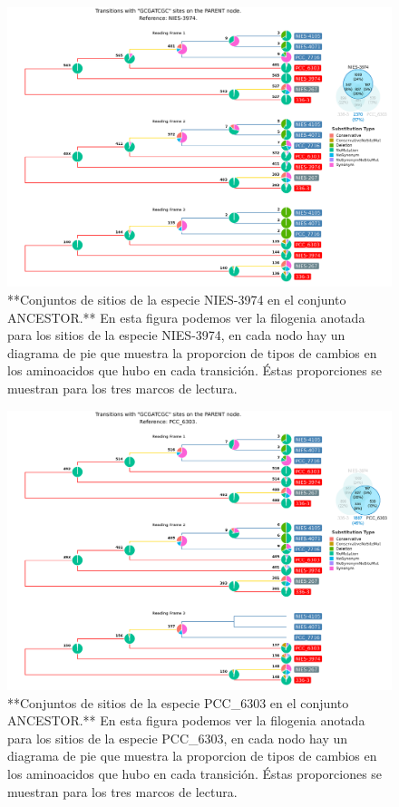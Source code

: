 \documentclass[
]{book}
\begin{document}
\begin{figure}

{\centering \includegraphics[width=1.2\linewidth]{Clados/Calothrix_B/figures/A/GCGATCGC/Ancestor/NIES-3974_Ancestor_A_tree} 

}

\caption{**Conjuntos de sitios de la especie NIES-3974 en el conjunto ANCESTOR.** En esta figura podemos ver la filogenia anotada para los sitios de la especie NIES-3974, en cada nodo hay un diagrama de pie que muestra la proporcion de tipos de cambios en los aminoacidos que hubo en cada transición. Éstas proporciones se muestran para los tres marcos de lectura.}\label{fig:FIG6}
\end{figure}

\begin{figure}

{\centering \includegraphics[width=1.2\linewidth]{Clados/Calothrix_B/figures/A/GCGATCGC/Ancestor/PCC_6303_Ancestral_A_tree} 

}

\caption{**Conjuntos de sitios de la especie PCC\_6303 en el conjunto ANCESTOR.** En esta figura podemos ver la filogenia anotada para los sitios de la especie PCC\_6303, en cada nodo hay un diagrama de pie que muestra la proporcion de tipos de cambios en los aminoacidos que hubo en cada transición. Éstas proporciones se muestran para los tres marcos de lectura.}\label{fig:FIG7}
\end{figure}
\end{document}
